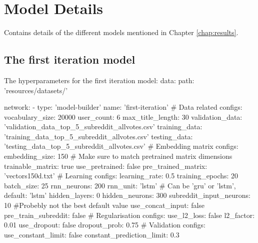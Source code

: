 \chapter{Model Details}
Contains details of the different models mentioned in Chapter \ref{chap:results}.

\section{The first iteration model}\label{sec:app2_first_iter}
The hyperparameters for the first iteration model:
data:
  path: 'resources/datasets/'

network:
  - type: 'model-builder'
    name: 'first-iteration'
    # Data related configs:
    vocabulary_size: 20000
    user_count: 6
    max_title_length: 30
    validation_data: 'validation_data_top_5_subreddit_allvotes.csv'
    training_data: 'training_data_top_5_subreddit_allvotes.csv'
    testing_data: 'testing_data_top_5_subreddit_allvotes.csv'
    # Embedding matrix configs:
    embedding_size: 150 # Make sure to match pretrained matrix dimensions
    trainable_matrix: true
    use_pretrained: false
    pre_trained_matrix: 'vectors150d.txt'
    # Learning configs:
    learning_rate: 0.5
    training_epochs: 20
    batch_size: 25
    rnn_neurons: 200
    rnn_unit: 'lstm' # Can be 'gru' or 'lstm', default: 'lstm'
    hidden_layers: 0
    hidden_neurons: 300
    subreddit_input_neurons: 10 #Probebly not the best default value
    use_concat_input: false
    pre_train_subreddit: false
    # Regularisation configs:
    use_l2_loss: false
    l2_factor: 0.01
    use_dropout: false
    dropout_prob: 0.75
    # Validation configs:
    use_constant_limit: false
    constant_prediction_limit: 0.3

